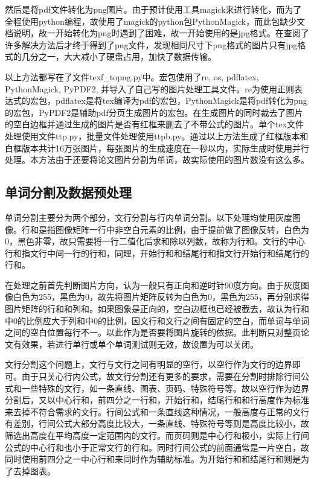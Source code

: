 \documentclass[12pt]{article}
\begin{document}
然后是将pdf文件转化为png图片。由于预计使用工具magick来进行转化，而为了全程使用python编程，故使用了magick的python包PythonMagick，而此包缺少文档说明，故一开始转化为png时遇到了困难，故一开始使用的是jpg格式。在查阅了许多解决方法后才终于得到了png文件，发现相同尺寸下png格式的图片只有jpg格式的几分之一，大大减小了硬盘占用，加快了数据传输。

以上方法都写在了文件texf\_topng.py中。宏包使用了re, os, pdflatex, PythonMagick, PyPDF2, 并导入了自己写的图片处理工具文件。re为使用正则表达式的宏包，pdflatex是将tex编译为pdf的宏包，PythonMagick是将pdf转化为png的宏包，PyPDF2是辅助pdf分页生成图片的宏包。在生成图片的同时裁去了图片的空白边框并通过生成的图片是否有红框来删去了不带公式的图片。单个tex文件处理使用文件ttp.py，批量文件处理使用ttpb.py。通过以上方法生成了红框版本和白框版本共计16万张图片，每张图片的生成速度在一秒以内，实际生成时使用并行处理。本方法由于还要将论文图片分割为单词，故实际使用的图片数没有这么多。

\subsection{单词分割及数据预处理}
\noindent

单词分割主要分为两个部分，文行分割与行内单词分割。以下处理均使用灰度图像。行和是指图像矩阵一行中非空白元素的比例，由于提前做了图像反转，白色为0，黑色非零，故只需要将一行二值化后求和除以列数，故称为行和。文行的中心行和指文行中间一行的行和，同理，开始行和和结尾行和指文行开始行和结尾行的行和。

在处理之前首先判断图片方向，认为一般只有正向和逆时针90度方向。由于灰度图像白色为255，黑色为0，故先将图片矩阵反转为白色为0，黑色为255，再分别求得图片矩阵的行和和列和。如果图象是正向的，空白边框也已经被截去，故认为行和中0的比例应大于列和中0的比例，因文行和文行之间有固定的空白，而单词与单词之间的空白位置每行不一。以此作为是否要将图片旋转的依据。此判断只对整页论文有效果，若进行单行或单个单词测试则无效，故设置为可以关闭。

文行分割这个问题上，文行与文行之间有明显的空行，以空行作为文行的边界即可。由于只关心行内公式，故文行分割还有更多的要求，需要在分割时排除行间公式和一些特殊的文行，如一条直线、图表、页码、特殊符号等。故以空行作为边界分割后，又以中心行和，前四分之一行和，开始行和，结尾行和和行高度作为标准来去掉不符合需求的文行。行间公式和一条直线这种情况，一般高度与正常的文行有差别，行间公式大部分高度比较大，一条直线、特殊符号等则是高度比较小，故筛选出高度在平均高度一定范围内的文行。而页码则是中心行和极小，实际上行间公式的中心行和也小于正常文行的行和。同时行间公式的前面通常是一片空白，故同时使用前四分之一中心行和来同时作为辅助标准。为开始行和和结尾行和则是为了去掉图表。
\end{document}
